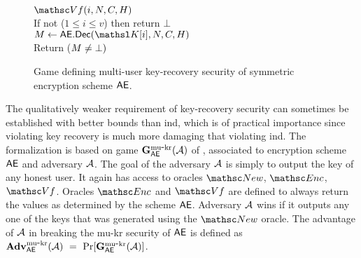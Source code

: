 

\begin{figure} [t]
{
\underline{$\VfO(i,\iv,\ciph,\header)$}\\[2pt]
If not ($1\leq i\leq v$) then return $\bot$ \\
$\msg \gets \seDec(\nkey[i],\iv,\ciph,\header)$ \\
Return ($M\neq\bot)$ \medskip
}
\vspace{-2ex}
\caption{Game defining multi-user key-recovery security of symmetric encryption scheme $\mathsf{AE}$.}
\label{fig-kr}
\hrulefill
\end{figure}



 The qualitatively weaker requirement of key-recovery security can sometimes be established with better bounds than ind, which is of practical importance since violating key recovery is much more damaging that violating ind. The formalization is based on game $\mathbf{G}^{\rm mu\mbox{-}kr}_{\mathsf{AE}}({\cal A})$ of , associated to encryption scheme $\mathsf{AE}$ and adversary ${\cal A}$.  The goal of the adversary ${\cal A}$ is simply to output the key of any honest user. It again has access to oracles $\NewO$, $\EncO$, $\VfO$. Oracles $\EncO$ and $\VfO$ are defined to always return the values as determined by the scheme $\mathsf{AE}$. Adversary ${\cal A}$ wins if it outputs any one of the keys that was generated using the $\NewO$ oracle. The advantage of ${\cal A}$ in breaking the mu-kr security of $\mathsf{AE}$ is defined as $
	\krAdv{\seScheme}{\advA} \ = \ \Pr[\gKR{\seScheme}(\advA)]$.

